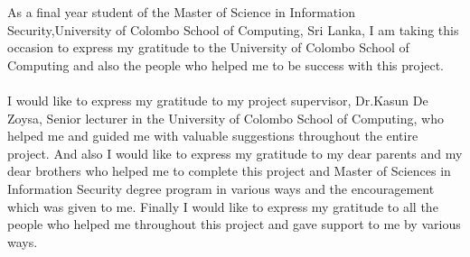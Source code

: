 As a final year student of the Master of Science in Information Security,University of Colombo School of Computing, Sri Lanka, I am taking this occasion to express my gratitude to the University of Colombo School of Computing and also the people who helped me to be success with this project.
\paragraph{}
I would like to express my gratitude to my project supervisor, Dr.Kasun De Zoysa, Senior lecturer in the University of Colombo School of Computing, who helped me and guided me with valuable suggestions throughout the entire project.
And also I would like to express my gratitude to my dear parents and my dear brothers who helped me to complete this project and Master of Sciences in Information Security degree program in various ways and the encouragement which was given to me.
Finally I would like to express my gratitude to all the people who helped me throughout this project and gave support to me by various ways. 	